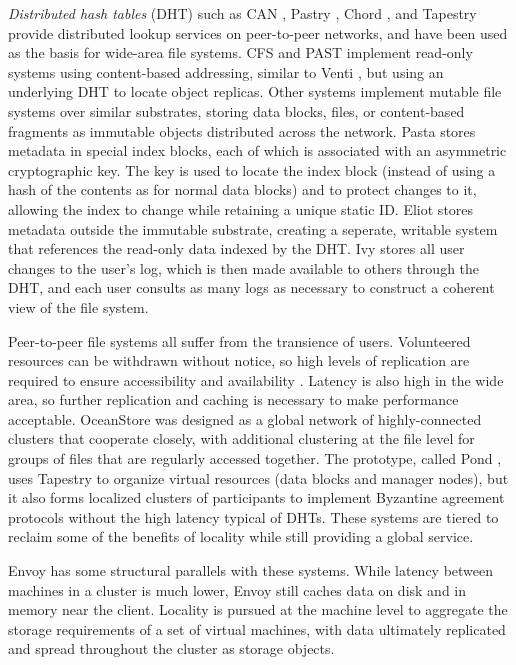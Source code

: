 \emph{Distributed hash tables} (DHT) such as CAN \cite{ratnasamy}, Pastry \cite{rowstron01b}, Chord \cite{stoica}, and Tapestry \cite{zhao01} provide distributed lookup services on peer-to-peer networks, and have been used as the basis for wide-area file systems. CFS \cite{dabek} and PAST \cite{rowstron01a} implement read-only systems using content-based addressing, similar to Venti \cite{quinlan}, but using an underlying DHT to locate object replicas. Other systems implement mutable file systems over similar substrates, storing data blocks, files, or content-based fragments \cite{rabin81} as immutable objects distributed across the network. Pasta \cite{moreton} stores metadata in special index blocks, each of which is associated with an asymmetric cryptographic key. The key is used to locate the index block (instead of using a hash of the contents as for normal data blocks) and to protect changes to it, allowing the index to change while retaining a unique static ID. Eliot \cite{stein02} stores metadata outside the immutable substrate, creating a seperate, writable system that references the read-only data indexed by the DHT. Ivy \cite{muthitacharoen02} stores all user changes to the user's log, which is then made available to others through the DHT, and each user consults as many logs as necessary to construct a coherent view of the file system.

Peer-to-peer file systems all suffer from the transience of users. Volunteered resources can be withdrawn without notice, so high levels of replication are required to ensure accessibility and availability \cite{blake,rabin89}. Latency is also high in the wide area, so further replication and caching is necessary to make performance acceptable. OceanStore \cite{kubiatowicz} was designed as a global network of highly-connected clusters that cooperate closely, with additional clustering at the file level for groups of files that are regularly accessed together. The prototype, called Pond \cite{rhea}, uses Tapestry to organize virtual resources (data blocks and manager nodes), but it also forms localized clusters of participants to implement Byzantine agreement protocols without the high latency typical of DHTs. These systems are tiered to reclaim some of the benefits of locality while still providing a global service.

Envoy has some structural parallels with these systems. While latency between machines in a cluster is much lower, Envoy still caches data on disk and in memory near the client. Locality is pursued at the machine level to aggregate the storage requirements of a set of virtual machines, with data ultimately replicated and spread throughout the cluster as storage objects.

